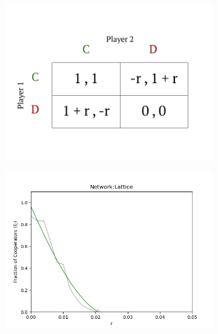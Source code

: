 \documentclass[11pt, A4 paper, twocolumn ]{article}
\begin{document}
		\begin{figure}[h]
		\centering
		\begin{subfigure}[b]{0.23\textwidth}
			\centering
			\includegraphics[width=\textwidth]{graphs/payoff-matrix}
			\caption{}
			\label{fig:payoff-matrix}
		\end{subfigure}
		\begin{subfigure}[b]{0.23\textwidth}
			\centering
			\includegraphics[width=\textwidth]{graphs/lat-imitate}
			\caption{}
			\label{fig:lat-imitate}
		\end{subfigure}
		\begin{subfigure}[b]{0.23\textwidth}
			\centering

\end{subfigure}
\end{figure}
\end{document}
